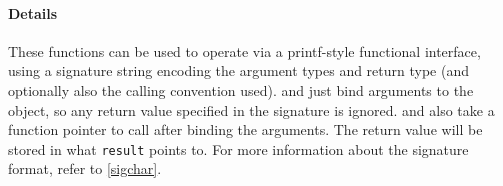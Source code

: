 \paragraph{Details}

These functions can be used to operate  via a printf-style
functional interface, using a signature string encoding the argument types and 
return type (and optionally also the calling convention used).
 and  just bind arguments to the 
object, so any return value specified in the signature is ignored. 
and  also take a function pointer to call after binding the arguments.
The return value will be stored in what \lstinline{result} points to.
For more information about the signature format, refer to \ref{sigchar}.

